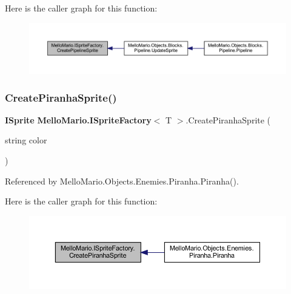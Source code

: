 Here is the caller graph for this function\+:
\nopagebreak
\begin{figure}[H]
\begin{center}
\leavevmode
\includegraphics[width=350pt]{interfaceMelloMario_1_1ISpriteFactory_a4ff315150e1dd48bdf9909c780aa6b94_icgraph}
\end{center}
\end{figure}
\mbox{\label{interfaceMelloMario_1_1ISpriteFactory_a9b9ea9182f152874997805b9aa6aafa9}} 
\subsubsection{Create\+Piranha\+Sprite()}
{\footnotesize\ttfamily \textbf{ I\+Sprite} \textbf{ Mello\+Mario.\+I\+Sprite\+Factory}$<$ T $>$.Create\+Piranha\+Sprite (\begin{DoxyParamCaption}\item[{string}]{color }\end{DoxyParamCaption})}



Referenced by Mello\+Mario.\+Objects.\+Enemies.\+Piranha.\+Piranha().

Here is the caller graph for this function\+:
\nopagebreak
\begin{figure}[H]
\begin{center}
\leavevmode
\includegraphics[width=350pt]{interfaceMelloMario_1_1ISpriteFactory_a9b9ea9182f152874997805b9aa6aafa9_icgraph}
\end{center}
\end{figure}
\mbox{\label{interfaceMelloMario_1_1ISpriteFactory_a8710fe9f56ca91875dd9886232c3b05d}} 
